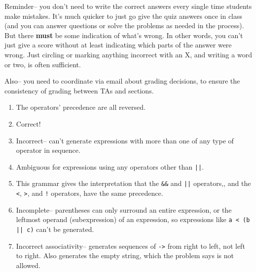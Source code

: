 \documentclass[11pt,fleqn]{article}
\begin{document}

  Reminder-- you don't need to write the correct answers every single time
students make mistakes.  It's much quicker to just go give the quiz answers
once in class (and you can answer questions or solve the problems as needed
in the process).  But there \textbf{must} be some indication of what's
wrong.  In other words, you can't just give a score without at least
indicating which parts of the answer were wrong.  Just circling or marking
anything incorrect with an X, and writing a word or two, is often
sufficient.

  Also-- you need to coordinate via email about grading decisions, to ensure
the consistency of grading between TAs and sections.

  \vspace{-.5mm}

  \begin{enumerate}

    \addtolength{\itemsep}{3mm}

    \item The operators' precedence are all reversed.

    \item Correct!

    \item Incorrect-- can't generate expressions with more than one of any
          type of operator in sequence.

    \item Ambiguous for expressions using any operators other than
          \texttt{||}.

    \item This grammar gives the interpretation that the \texttt{\&\&} and
          \texttt{||} operators,, and the \texttt{<}, \texttt{>}, and
          \texttt{!}  operators, have the same precedence.

    \item Incomplete-- parentheses can only surround an entire expression,
          or the leftmost operand (subexpression) of an expression, so
          expressions like \texttt{a < (b || c)} can't be generated.

    \item Incorrect associativity-- generates sequences of \texttt{->} from
          right to left, not left to right.  Also generates the empty
          string, which the problem says is not allowed.

  \end{enumerate}
\end{document}
